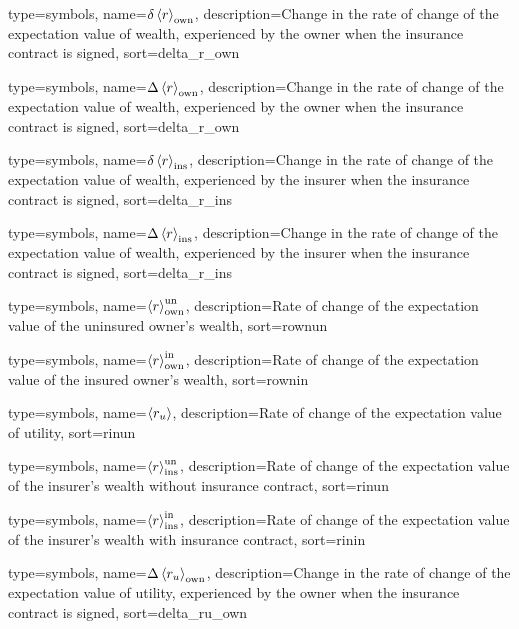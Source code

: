 {
 type={symbols}, 
 name={\ensuremath{\delta \ave{r}_{\text{own}}}},
 description={Change in the rate of change of the expectation value of wealth, experienced by the owner when the insurance contract is signed},
 sort=delta_r_own
}

{
 type={symbols}, 
 name={\ensuremath{\Delta \ave{r}_{\text{own}}}},
 description={Change in the rate of change of the expectation value of wealth, experienced by the owner when the insurance contract is signed},
 sort=delta_r_own
}

{
 type={symbols}, 
 name={\ensuremath{\delta \ave{r}_{\text{ins}}}},
 description={Change in the rate of change of the expectation value of wealth, experienced by the insurer when the insurance contract is signed},
 sort=delta_r_ins
}

{
 type={symbols}, 
 name={\ensuremath{\Delta \ave{r}_{\text{ins}}}},
 description={Change in the rate of change of the expectation value of wealth, experienced by the insurer when the insurance contract is signed},
 sort=delta_r_ins
}

{
  type={symbols}, 
  name={\ensuremath{\ave{r}_{\text{own}}^{\text{un}}}},
  description={Rate of change of the expectation value of the uninsured owner's wealth},
  sort=rownun
}

{
  type={symbols}, 
  name={\ensuremath{\ave{r}_{\text{own}}^{\text{in}}}},
  description={Rate of change of the expectation value of the insured owner's wealth},
  sort=rownin
}

{
  type={symbols}, 
  name={\ensuremath{\ave{r_u}}},
  description={Rate of change of the expectation value of utility},
  sort=rinun
}

{
  type={symbols}, 
  name={\ensuremath{\ave{r}_{\text{ins}}^{\text{un}}}},
  description={Rate of change of the expectation value of the insurer's wealth without insurance contract},
  sort=rinun
}

{
  type={symbols}, 
  name={\ensuremath{\ave{r}_{\text{ins}}^{\text{in}}}},
  description={Rate of change of the expectation value of the insurer's wealth with insurance contract},
  sort=rinin
}






{
 type={symbols}, 
 name={\ensuremath{\Delta \ave{r_u}_{\text{own}}}},
 description={Change in the rate of change of the expectation value of utility, experienced by the owner when the insurance contract is signed},
 sort=delta_ru_own
}

